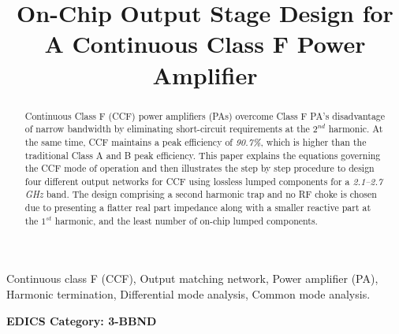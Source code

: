 \documentclass[conference]{IEEEtran}
\begin{document}
\title{On-Chip Output Stage Design for  \color{blue} A \color{black} Continuous Class F Power Amplifier}

\author{ 
}

\maketitle

\begin{abstract}
Continuous Class F (CCF) power amplifiers (PAs) overcome Class F PA's disadvantage of narrow bandwidth by eliminating short-circuit requirements at the $2^{nd}$ harmonic. At the same time, CCF maintains a peak efficiency of \textit{90.7\%}, which is higher than the traditional Class A and B peak efficiency. This paper explains the equations governing the CCF mode of operation and then illustrates the step by step procedure to design  four different output networks for CCF using lossless lumped components for a \textit{2.1--2.7 GHz} band.
The design comprising a second harmonic trap and no RF choke is chosen \color{blue} due to presenting \color{black} a flatter real part impedance along with a smaller reactive part at the $1^{st}$ harmonic, and  the least number of on-chip lumped components.
\end{abstract}

\vspace{1mm}
\begin{IEEEkeywords}
Continuous class F (CCF), Output matching network, Power amplifier (PA), Harmonic termination, Differential mode analysis, Common mode analysis. 
\end{IEEEkeywords}



\ifCLASSOPTIONpeerreview
\begin{center} \bfseries EDICS Category: 3-BBND \end{center}
\fi

\IEEEpeerreviewmaketitle
\end{document}
